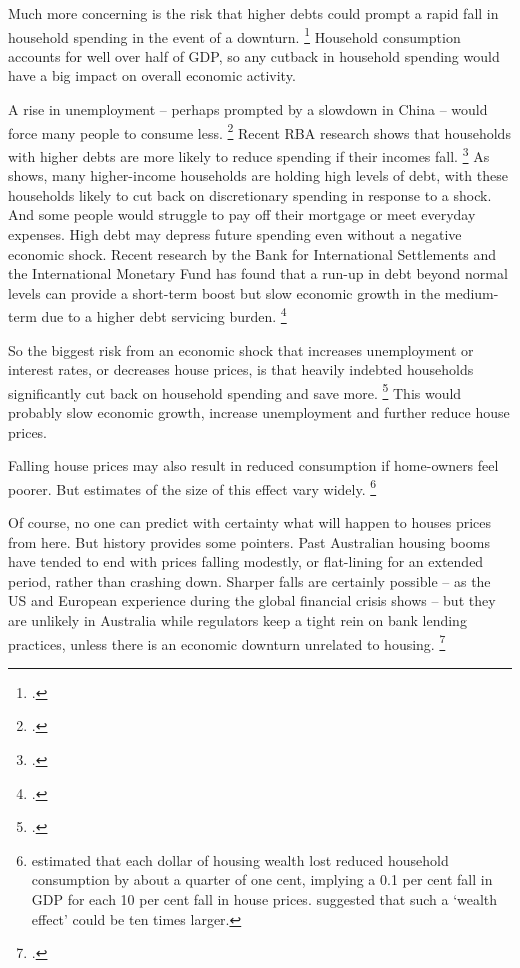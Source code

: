 Much more concerning is the risk that higher debts could prompt a rapid fall in household spending in the event of a downturn.%
	\footcites{Daley-Coates-Wiltshire-2017-InsideStory-What-comes-after-housing-boom}{IMF-2017-Financial-Stability--Is-growth-at-risk}
Household consumption accounts for well over half of GDP, so any cutback in household spending would have a big impact on overall economic activity.

A rise in unemployment -- perhaps prompted by a slowdown in China -- would force many people to consume less.%
	\footcite{Grenville-2017-theInterpreter-Chinas-financial-concerns}
Recent RBA research shows that households with higher debts are more likely to reduce spending if their incomes fall.%
	\footcites{La-Cava-2016-Hhold-cash-flow-channel}{Lowe2017Householddebt}
As  shows, many higher-income households are holding high levels of debt,
with these households likely to cut back on discretionary spending in response to a shock.
And some people would struggle to pay off their mortgage or meet everyday expenses.
High debt may depress future spending even without a negative economic shock.
Recent research by the Bank for International Settlements and the International Monetary Fund
has found that a run-up in debt beyond normal levels can provide
a short-term boost
but slow economic growth in the medium-term due to a higher debt servicing burden.%
	\footcites[][Box~III.A]{BIS-87th-Annual-report}{Lombardi-2017-real-effects-of-hhold-debt}


So the biggest risk from an economic shock that increases unemployment or interest rates, or decreases house prices, is that heavily indebted households significantly cut back on household spending and save more.%
	\footcites{Lowe2017Householddebt}{RBAFinancialStabilityApril2017}{IMF-2017-Financial-Stability--Is-growth-at-risk}
This would probably slow economic growth, increase unemployment and further reduce house prices.

Falling house prices may also result in reduced consumption if home-owners feel poorer.
But estimates of the size of this effect vary widely.%
    \footnote{\textcite{Gillitzer-Wang-2016-Housing-wealth-effects} estimated that each dollar of housing wealth lost reduced household consumption by about a quarter of one cent, implying a 0.1 per cent fall in GDP for each 10 per cent fall in house prices.
    \textcite{Windsor-et-al-2013-homeprices} suggested that such a `wealth effect' could be ten times larger.}

Of course, no one can predict with certainty what will happen to houses prices from here. But history provides some pointers. Past Australian housing booms have tended to end with prices falling modestly, or flat-lining for an extended period, rather than crashing down. Sharper falls are certainly possible – as the US and European experience during the global financial crisis shows – but they are unlikely in Australia while regulators keep a tight rein on bank lending practices, unless there is an economic downturn unrelated to housing.%
    \footcite{Daley-Coates-Wiltshire-2017-InsideStory-What-comes-after-housing-boom}



